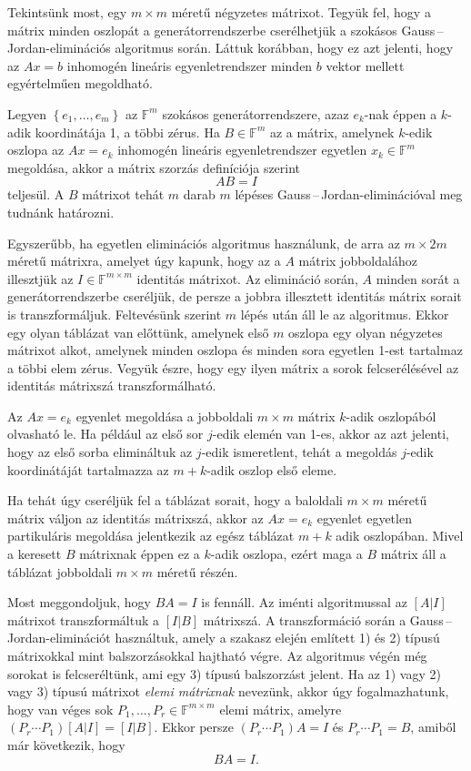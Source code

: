 \documentclass[9pt, a4paper, showtrims]{memoir}
\theoremstyle{plain}
\theoremstyle{remark}
\theoremstyle{definition}
\begin{document}
Tekintsünk most, egy $m\times m$ méretű négyzetes mátrixot.
Tegyük fel, hogy a mátrix minden oszlopát a generátorrendszerbe cserélhetjük
a szokásos Gauss\,--\,Jordan-eliminációs algoritmus  során.
Láttuk korábban, hogy ez azt jelenti, hogy az $Ax=b$ inhomogén lineáris egyenletrendszer
minden $b$ vektor mellett egyértelműen megoldható.

Legyen $\left\{ e_1,\ldots,e_m \right\}$ az $\mathbb{F}^m$ szokásos generátorrendszere,
azaz $e_k$-nak éppen a $k$-adik koordinátája 1, a többi zérus.
Ha $B\in\mathbb{F}^m$ az a mátrix,
amelynek $k$-edik oszlopa az $Ax=e_k$ inhomogén lineáris egyenletrendszer egyetlen $x_k\in\mathbb{F}^m$ megoldása,
akkor a mátrix szorzás definíciója szerint
\[
	AB=I
\]
teljesül.
A $B$ mátrixot tehát $m$ darab $m$ lépéses Gauss\,--\,Jordan-eliminációval  meg tudnánk határozni.

Egyszerűbb,
ha egyetlen eliminációs algoritmus használunk, de arra az $m\times 2m$ méretű mátrixra,
amelyet úgy kapunk, hogy az a $A$ mátrix jobboldalához illesztjük az $I\in\mathbb{F}^{m\times m}$ identitás mátrixot.
Az elimináció során,
$A$ minden sorát a generátorrendszerbe cseréljük, de persze a jobbra illesztett identitás
mátrix sorait is transzformáljuk.
Feltevésünk szerint $m$ lépés után áll le az algoritmus.
Ekkor egy  olyan táblázat van előttünk, amelynek első $m$ oszlopa egy olyan négyzetes
mátrixot alkot, amelynek minden oszlopa és minden sora egyetlen 1-est tartalmaz a többi elem zérus.
Vegyük észre,
hogy egy ilyen mátrix a sorok felcserélésével az identitás mátrixszá transzformálható.

Az $Ax=e_k$ egyenlet megoldása a jobboldali $m\times m$ mátrix $k$-adik oszlopából olvasható le.
Ha például az első sor $j$-edik elemén van 1-es,
akkor az azt jelenti, hogy az első sorba elimináltuk az $j$-edik ismeretlent,
tehát a megoldás $j$-edik koordinátáját tartalmazza az $m+k$-adik oszlop első eleme.

Ha tehát úgy cseréljük fel a táblázat sorait,
hogy a baloldali $m\times m$ méretű mátrix váljon az identitás mátrixszá,
akkor az $Ax=e_k$ egyenlet egyetlen partikuláris megoldása jelentkezik az egész táblázat
$m+k$ adik oszlopában.
Mivel a keresett $B$ mátrixnak éppen ez a $k$-adik oszlopa,
ezért maga a $B$ mátrix áll a táblázat jobboldali $m\times m$ méretű részén.

Most meggondoljuk, hogy $BA=I$ is fennáll.
Az iménti algoritmussal az $[A|I]$ mátrixot transzformáltuk a $[I|B]$ mátrixszá.
A transzformáció során a Gauss\,--\,Jordan-eliminációt használtuk,  amely a szakasz elején említett 1) és 2) típusú mátrixokkal mint balszorzásokkal hajtható végre.
Az algoritmus végén még sorokat is felcseréltünk, ami egy 3) típusú balszorzást jelent.
Ha az 1) vagy 2) vagy 3) típusú mátrixot \emph{elemi mátrixnak}
nevezünk,
akkor úgy fogalmazhatunk,
hogy van véges sok $P_1,\ldots,P_r\in\mathbb{F}^{m\times m}$ elemi mátrix, amelyre
\(
(P_r\cdots P_1)\left[ A|I \right]=\left[ I|B \right].
\)
Ekkor persze $(P_r\cdots P_1)A=I$ és $P_r\cdots P_1=B$,
amiből már következik, hogy
\[
	BA=I.
\]
\end{document}
